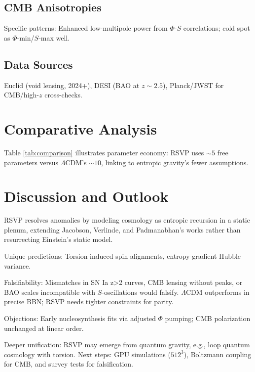 \documentclass[11pt]{article}
\theoremstyle{plain}
\theoremstyle{definition}
\begin{document}
\subsection{CMB Anisotropies}
Specific patterns: Enhanced low-multipole power from $\Phi$-$S$ correlations; cold spot as $\Phi$-min/$S$-max well.

\subsection{Data Sources}
Euclid (void lensing, 2024+), DESI (BAO at $z\sim2.5$), Planck/JWST for CMB/high-$z$ cross-checks.

\section{Comparative Analysis}
Table \ref{tab:comparison} illustrates parameter economy: RSVP uses $\sim5$ free parameters versus $\Lambda$CDM's $\sim10$, linking to entropic gravity's fewer assumptions.

\section{Discussion and Outlook}
RSVP resolves anomalies by modeling cosmology as entropic recursion in a static plenum, extending Jacobson, Verlinde, and Padmanabhan's works rather than resurrecting Einstein's static model.

Unique predictions: Torsion-induced spin alignments, entropy-gradient Hubble variance.

Falsifiability: Mismatches in SN Ia z>2 curves, CMB lensing without peaks, or BAO scales incompatible with $S$-oscillations would falsify. $\Lambda$CDM outperforms in precise BBN; RSVP needs tighter constraints for parity.

Objections: Early nucleosynthesis fits via adjusted $\Phi$ pumping; CMB polarization unchanged at linear order.

Deeper unification: RSVP may emerge from quantum gravity, e.g., loop quantum cosmology with torsion. Next steps: GPU simulations ($512^3$), Boltzmann coupling for CMB, and survey tests for falsification.
\end{document}

